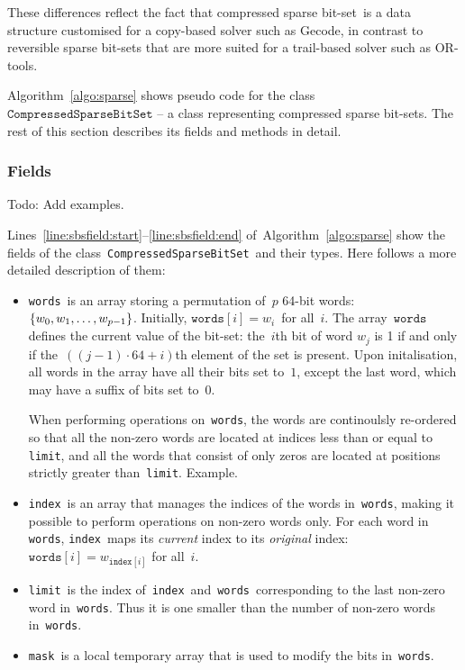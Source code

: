 \documentclass[a4paper,11pt]{article}
\newcommand{\Todo}[1]{{\color{blue}#1}}
\newcommand{\Algoref}[1]{Algorithm~\ref{#1}}
\newcommand{\Linesref}[2]{Lines~\ref{#1}--\ref{#2}}
\newcommand{\Words}{\texttt{words}}
\newcommand{\Index}{\texttt{index}}
\newcommand{\Mask}{\texttt{mask}}
\newcommand{\Limit}{\texttt{limit}}
\newcommand{\SparseBitSet}{\texttt{CompressedSparseBitSet}}
\newcommand{\bitset}[0]{compressed sparse bit-set}
\numberwithin{equation}{section}
\begin{document}
These differences reflect the fact that \bitset~is a data structure customised
for a copy-based solver such as Gecode, in contrast to reversible sparse bit-sets
that are more suited for a trail-based solver such as OR-tools.

\Algoref{algo:sparse} shows pseudo code for the class~$\SparseBitSet$ -- a class
representing {\bitset}s.
The rest of this section describes its fields and methods in detail.

\begin{algorithm}[H]
  \begin{algorithmic}[1]  %
    
    \end{algorithmic}
  \caption{Pseudo code for the class \SparseBitSet.}
  \label{algo:sparse}
\end{algorithm}

\subsubsection{Fields}
\label{sbs:fields}

\Todo{Todo: Add examples.}

\Linesref{line:sbsfield:start}{line:sbsfield:end} of~\Algoref{algo:sparse} show the fields
of the class~\SparseBitSet~and their types. Here follows a more detailed description of them:

\begin{itemize}
  \item \Words~is an array storing a permutation of~$p$ 64-bit 
    words:~$\left\{w_0, w_1, \dots, w_{p-1}\right\}$.
    Initially, $\Words[i] = w_i$~for all~$i$.
    The array~$\Words$ defines the current
    value of the bit-set:
    the~$i$th bit of word $w_j$ is 1 if and only if 
    the~$\left((j-1) \cdot 64 + i\right)$th element of
    the set is present. 
    Upon initalisation, all words in the array 
    have all their bits set to~$1$,
    except the last word, which may have a suffix of bits set to~$0$. 
    
    When performing operations on~\Words, the words are continoulsly re-ordered
    so that all the non-zero words are
    located at indices less than or equal to \Limit, and all the words that
    consist of only zeros are located at positions strictly greater than~\Limit.
    \Todo{Example.}

  \item \Index~is an array that manages the indices of the words in~\Words,
    making it possible to perform operations on non-zero words only.
    For each word in \Words, \Index~maps its \emph{current} index to its
    \emph{original} index:~$\Words[i] = w_{\Index[i]}$ for all~$i$.
    
  \item \Limit~is the index of~\Index~and~\Words~corresponding
    to the last non-zero word in~\Words.
    Thus it is one smaller than the number of non-zero words in~\Words.

  \item \Mask~is a local temporary array that is used to modify the bits in~\Words.

\end{itemize}
\end{document}
